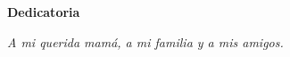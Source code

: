 
\thispagestyle{empty}
\cleardoublepage

\vspace*{0.35\textheight}

\begin{center}
  {\Huge\bfseries Dedicatoria}

  \vspace{2cm}

  {\Large\emph{A mi querida mamá, a mi familia y a mis amigos.}}
\end{center}

\vspace*{\fill}
\cleardoublepage

